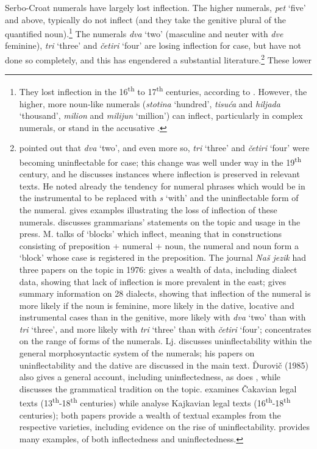 \documentclass[output=paper]{langscibook}
\begin{document}
Serbo-Croat numerals have largely lost inflection. The higher numerals, \textit{pet} ‘five’ and above, typically do not inflect (and they take the genitive plural of the quantified noun).\footnote{ \textrm{They lost inflection in the 16}\textrm{\textsuperscript{th}} \textrm{to 17}\textrm{\textsuperscript{th}} \textrm{centuries, according to \citet[138]{Rogić1954}. However, the higher, more noun-like numerals (}\textrm{\textit{stotina}} \textrm{‘hundred’,} \textrm{\textit{tisuća}} \textrm{and} \textrm{\textit{hiljada}} \textrm{‘thousand’,} \textrm{\textit{milion} }\textrm{and} \textrm{\textit{milijun}} \textrm{‘million’) can inflect, particularly in complex numerals, or stand in the accusative \citep[11-12]{Popović1979}.} } The numerals \textit{dva} ‘two’ (masculine and neuter with \textit{dve} feminine), \textit{tri} ‘three’ and \textit{četiri} ‘four’ are losing inflection for case, but have not done so completely, and this has engendered a substantial literature.\footnote{\citet{Marković1951} pointed out that \textit{dva} ‘two’, and even more so, \textit{tri} ‘three’ and \textit{četiri} ‘four’ were becoming uninflectable for case; this change was well under way in the 19\textsuperscript{th} century, and he discusses instances where inflection is preserved in relevant texts. He noted already the tendency for numeral phrases which would be in the instrumental to be replaced with \textit{s} ‘with’ and the uninflectable form of the numeral. \citet{Rogić1954} gives examples illustrating the loss of inflection of these numerals. \citet{Hamm1956} discusses grammarians’ statements on the topic and usage in the press. M. \citet{Popović1967} talks of ‘blocks’ which inflect, meaning that in constructions consisting of preposition + numeral + noun, the numeral and noun form a ‘block’ whose case is registered in the preposition. The journal \textit{Naš jezik} had three papers on the topic in 1976: \citet{Kraljević1976} gives a wealth of data, including dialect data, showing that lack of inflection is more prevalent in the east; \citet{Nikolić1976} gives summary information on 28 dialects, showing that inflection of the numeral is more likely if the noun is feminine, more likely in the dative, locative and instrumental cases than in the genitive, more likely with \textit{dva} ‘two’ than with \textit{tri} ‘three’, and more likely with \textit{tri} ‘three’ than with \textit{četiri} ‘four’; \citet{Radović-Tešić1976} concentrates on the range of forms of the numerals. Lj. \citet{Popović1979} discusses uninflectability within the general morphosyntactic system of the numerals; his papers on uninflectability and the dative are discussed in the main text. Ďurovič (1985) also gives a general account, including uninflectedness, as does \citet{Browne2022}, while \citet{Grubišić1994} discusses the grammatical tradition on the topic. \citet{Kuzmić2007} examines Čakavian legal texts (13\textsuperscript{th}{}-18\textsuperscript{th} centuries) while \citet{KuzmićKuzmić2007} analyse Kajkavian legal texts (16\textsuperscript{th}{}-18\textsuperscript{th} centuries); both papers provide a wealth of textual examples from the respective varieties, including evidence on the rise of uninflectability. \citet[148-193]{Stefanović2019} provides many examples, of both inflectedness and uninflectedness.} These lower 
\end{document}
